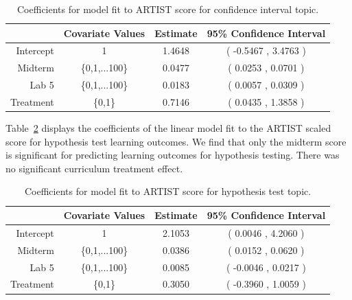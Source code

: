 \begin{table}[hbtp]
\centering
\begin{tabular}{rccc}
  \hline
 & Covariate Values & Estimate & 95\% Confidence Interval \\ 
  \hline
Intercept & 1 & 1.4648 & ( -0.5467 , 3.4763 ) \\ 
  Midterm & \{0,1,...100\} & 0.0477 & (  0.0253 , 0.0701 ) \\ 
  Lab 5  &  \{0,1,...100\} & 0.0183 & (  0.0057 , 0.0309 ) \\ 
  Treatment &  \{0,1\} & 0.7146 & (  0.0435 , 1.3858 ) \\ 
   \hline
\end{tabular}
\caption{Coefficients for model fit to ARTIST score for confidence interval topic.}
\label{tab:cimod}
\end{table}

Table~\ref{tab:htmod} displays the coefficients of the linear model fit to the ARTIST scaled score for hypothesis test learning outcomes.  We find that only the midterm score is significant for predicting learning outcomes for hypothesis testing. There was no significant curriculum treatment effect. \\

\begin{table}[hbtp]
\centering
\begin{tabular}{rccc}
  \hline
 & Covariate Values & Estimate & 95\% Confidence Interval \\ 
  \hline
Intercept & 1 & 2.1053 & ( 0.0046 , 4.2060 ) \\ 
  Midterm & \{0,1,...100\} & 0.0386 & (  0.0152 , 0.0620 ) \\ 
  Lab 5  &  \{0,1,...100\} & 0.0085 & (  -0.0046 , 0.0217 ) \\ 
  Treatment &  \{0,1\} & 0.3050 & (  -0.3960 , 1.0059 ) \\ 
   \hline
\end{tabular}
\caption{Coefficients for model fit to ARTIST score for hypothesis test topic.}
\label{tab:htmod}
\end{table}



